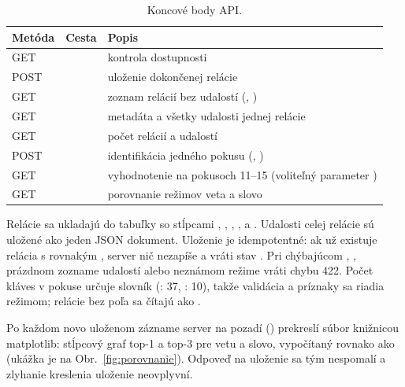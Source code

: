 \begin{table}[!htbp]
  \centering
  \small
  \caption{Koncové body API.}
  \label{tab:api}
  \begin{tabularx}{\textwidth}{|l|l|Y|}
    \hline
     \textbf{Metóda} & \textbf{Cesta} & \textbf{Popis} \\
    \hline
    GET  &  & kontrola dostupnosti \\
    \hline
    POST &  & uloženie dokončenej relácie \\
    \hline
    GET  &  & zoznam relácií bez udalostí (, ) \\
    \hline
    GET  &  & metadáta a všetky udalosti jednej relácie \\
    \hline
    GET  &  & počet relácií a udalostí \\
    \hline
    POST &  & identifikácia jedného pokusu (, ) \\
    \hline
    GET  &  & vyhodnotenie na pokusoch 11--15 (voliteľný parameter ) \\
    \hline
    GET  &  & porovnanie režimov veta a slovo \\
    \hline
  \end{tabularx}
\end{table}

Relácie sa ukladajú do tabuľky  so stĺpcami ,
, , ,
 a . Udalosti celej relácie sú uložené
ako jeden JSON dokument. Uloženie je idempotentné: ak už existuje relácia
s rovnakým , server nič nezapíše a vráti stav
. Pri chýbajúcom ,
, prázdnom zozname udalostí alebo neznámom režime vráti
chybu 422. Počet kláves v pokuse určuje slovník 
(: 37, : 10), takže validácia a príznaky sa riadia
režimom; relácie bez poľa  sa čítajú ako .

Po každom novo uloženom zázname server na pozadí ()
prekreslí súbor  knižnicou matplotlib: stĺpcový graf
top-1 a top-3 pre vetu a slovo, vypočítaný rovnako ako  (ukážka je na Obr.~\ref{fig:porovnanie}).
Odpoveď na uloženie sa tým nespomalí a zlyhanie kreslenia uloženie neovplyvní.

